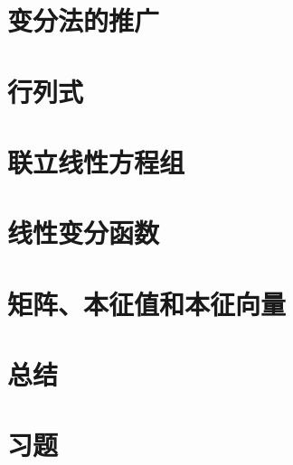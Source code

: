 \section{变分法的推广}
\label{sec:8.2 Extension of the Variational Method}













\section{行列式}
\label{sec:8.3 Determinants}

\section{联立线性方程组}
\label{sec:8.4 Simultaneous Linear Equations}

\section{线性变分函数}
\label{sec:8.5 Linear Variational Functions}

\section{矩阵、本征值和本征向量}
\label{sec:8.6 Matrices, Eigenvalues, and Eigenvectors}

\section*{总结}

\section*{习题}